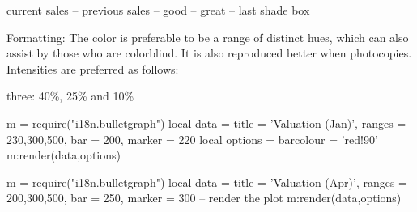 current sales --
previous sales --
good -- 
great -- last shade box

Formatting: The color is preferable to be a range of distinct hues, which can also assist by those who are colorblind. It is also reproduced better when photocopies.  Intensities are preferred as follows:

three: 40\%, 25\% and 10\%

\makeatletter
\newenvironment {bulletgraph} {\luacode@begin\luacode@table@soft} {}
\makeatother



\providecommand{\bulletgauge}[4][]{
    \begin{tikzpicture}[scale=0.8, font=\arial]
    \begin{axis}[
       width=8cm,
       chartheight = 60pt,
       xtick pos=left, 
       xtick = {0,50,...,400, 450},
       ytick=\empty,
       xmin=50, xmax=450,
        tick align=outside,
        axis on top,
        every axis title/.style={
            at={(rel axis cs:0,0.5)},
            anchor=east,
            align=right,
            xshift=-0.5em
        },
        #1
    ]
    \pgfplotsinvokeforeach{#4}{
        \pgfplotsset{cycle list name=bullet}
        \addplot +[xbar, bar width=7ex ] coordinates {(##1,0)};
    }
    \addplot [fill= barcolour, xbar, barwidth ] coordinates {(#2,0)};    
    \addplot [mark=|, mark options={very thick}, mark size=2ex, ] coordinates {(#3,0)}; 
    \end{axis}
    \end{tikzpicture}
}

\begin{scriptexample}{}{}
\begin{bulletgraph}
  m = require("i18n.bulletgraph")
 local data = {
     title = 'Valuation (Jan)',
     ranges = {230,300,500},
     bar = 200,
     marker = 220}
     local options = {
        barcolour = 'red!90'
   } 
m:render(data,options)        
\end{bulletgraph}
\medskip

\begin{bulletgraph}
   m = require("i18n.bulletgraph")
   local data = {
      title = 'Valuation (Apr)',
      ranges = {200,300,500},
      bar = 250,
      marker = 300}
   -- render the plot
   m:render(data,options)           
\end{bulletgraph}
\end{scriptexample}

